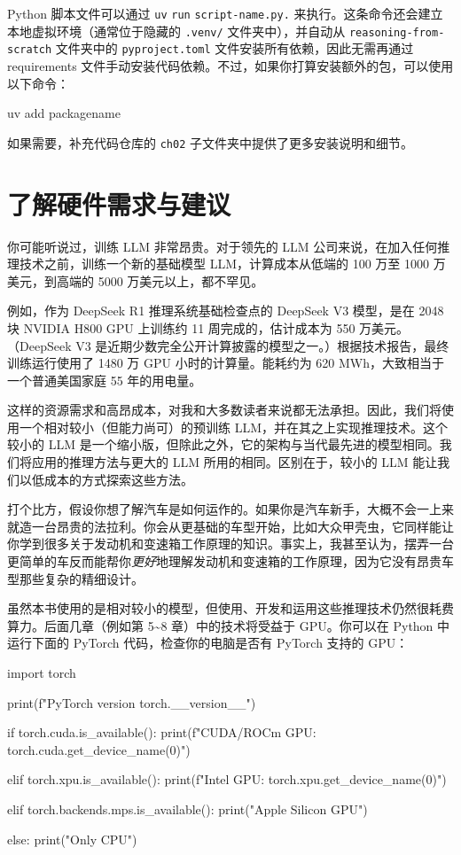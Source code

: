 Python 脚本文件可以通过 \texttt{uv} \texttt{run} \texttt{script-name.py.} 来执行。这条命令还会建立本地虚拟环境（通常位于隐藏的 \texttt{.venv/} 文件夹中），并自动从 \texttt{reasoning-from-scratch} 文件夹中的 \texttt{pyproject.toml} 文件安装所有依赖，因此无需再通过 requirements 文件手动安装代码依赖。不过，如果你打算安装额外的包，可以使用以下命令：

\begin{codebox}
uv add packagename
\end{codebox}

如果需要，补充代码仓库的 \texttt{ch02} 子文件夹中提供了更多安装说明和细节。

\section{了解硬件需求与建议}

你可能听说过，训练 LLM 非常昂贵。对于领先的 LLM 公司来说，在加入任何推理技术之前，训练一个新的基础模型 LLM，计算成本从低端的 100 万至 1000 万美元，到高端的 5000 万美元以上，都不罕见。

例如，作为 DeepSeek R1 推理系统基础检查点的 DeepSeek V3 模型，是在 2048 块 NVIDIA H800 GPU 上训练约 11 周完成的，估计成本为 550 万美元。（DeepSeek V3 是近期少数完全公开计算披露的模型之一。）根据技术报告，最终训练运行使用了 1480 万 GPU 小时的计算量。能耗约为 620 MWh，大致相当于一个普通美国家庭 55 年的用电量。

这样的资源需求和高昂成本，对我和大多数读者来说都无法承担。因此，我们将使用一个相对较小（但能力尚可）的预训练 LLM，并在其之上实现推理技术。这个较小的 LLM 是一个缩小版，但除此之外，它的架构与当代最先进的模型相同。我们将应用的推理方法与更大的 LLM 所用的相同。区别在于，较小的 LLM 能让我们以低成本的方式探索这些方法。

打个比方，假设你想了解汽车是如何运作的。如果你是汽车新手，大概不会一上来就造一台昂贵的法拉利。你会从更基础的车型开始，比如大众甲壳虫，它同样能让你学到很多关于发动机和变速箱工作原理的知识。事实上，我甚至认为，摆弄一台更简单的车反而能帮你\emph{更好}地理解发动机和变速箱的工作原理，因为它没有昂贵车型那些复杂的精细设计。

虽然本书使用的是相对较小的模型，但使用、开发和运用这些推理技术仍然很耗费算力。后面几章（例如第 5\textasciitilde{}8 章）中的技术将受益于 GPU。你可以在 Python 中运行下面的 PyTorch 代码，检查你的电脑是否有 PyTorch 支持的 GPU：

\begin{codebox}
import torch

print(f"PyTorch version {torch.__version__}")

if torch.cuda.is_available():
    print(f"CUDA/ROCm GPU: {torch.cuda.get_device_name(0)}")

elif torch.xpu.is_available():
    print(f"Intel GPU: {torch.xpu.get_device_name(0)}")

elif torch.backends.mps.is_available():
    print("Apple Silicon GPU")

else:
    print("Only CPU")
\end{codebox}


